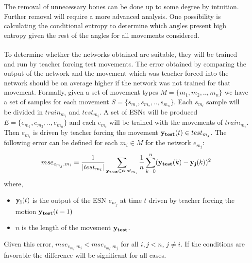 \documentclass[10pt]{article}
\begin{document}
The removal of unnecessary bones can be done up to some degree by intuition. Further removal will require a more advanced analysis. One possibility is calculating the conditional entropy\cite{AILecture} to determine which angles present high entropy given the rest of the angles for all movements considered. 
\\\\
To determine whether the networks obtained are suitable, they will be trained and run by teacher forcing test movements. The error obtained by comparing the output of the network and the movement which was teacher forced into the network should be on average higher if the network was not trained for that movement. Formally, given a set of movement types $M=\{m_1,m_2,..,m_n\}$ we have a set of samples for each movement $S=\{s_{m_1},s_{m_2},..,s_{m_n}\}$. Each $s_{m_i}$ sample will be divided in $train_{m_i}$ and $test_{m_i}$. A set of ESNs will be produced $E=\{e_{m_1},e_{m_2},..,e_{m_n}\}$ and each $e_{m_i}$ will be trained with the movements of $train_{m_i}$. Then $e_{m_i}$ is driven by teacher forcing the movement ${\bf y_{test}}(t) \in test_{m_j}$. The following error can be defined for each $m_i \in M$ for the network $e_{m_j}$:
\[
mse_{e_{m_j},m_i}=\frac{1}{|test_{m_i}|}\sum_{{\bf y_{test}} \in test_{m_i}}\frac{1}{n}\sum_{k=0}^{n}({\bf y_{test}}(k) - {\bf y_j}(k))^2
\]
where, 
\begin{itemize}
  \item ${\bf y_j}(t)$ is the output of the ESN $e_{m_j}$ at time $t$ driven by teacher forcing the motion ${\bf y_{test}}(t-1)$ 
  \item $n$ is the length of the movement ${\bf y_{test}}$. 
\end{itemize}
Given this error, $mse_{e_{m_i},m_i} < mse_{e_{m_i},m_j}$ for all $i,j<n$, $j\neq i$. If the conditions are favorable the difference will be significant for all cases.
\end{document}
